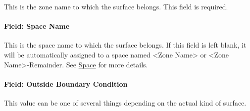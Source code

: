 This is the zone name to which the surface belongs. This field is required.

\paragraph{Field: Space Name}\label{field-space-name-10-000}

This is the space name to which the surface belongs. If this field is left blank, it will be automatically assigned to a space named <Zone Name> or <Zone Name>-Remainder. See \hyperref[space]{Space} for more details.

\paragraph{Field: Outside Boundary Condition}\label{field-outside-boundary-condition}

This value can be one of several things depending on the actual kind of surface.

